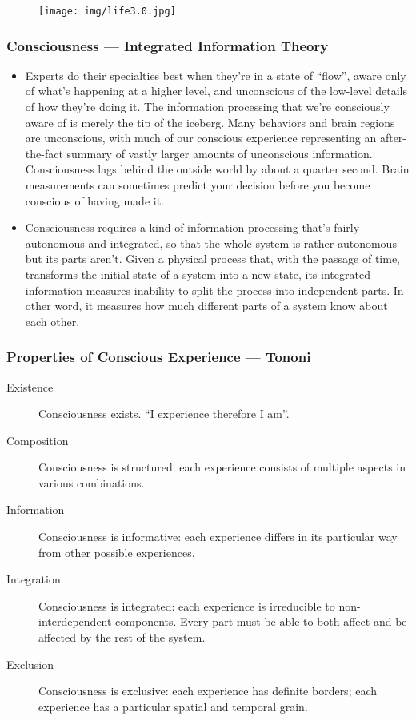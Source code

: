 \documentclass[UTF8,11pt,colorlinks,compress,openany]{beamer}%
\begin{document}
\begin{frame}\frametitle{}
\begin{figure}[H]
\texttt{[image: img/life3.0.jpg]}
\end{figure}	
\end{frame}

\begin{frame}\frametitle{Consciousness --- Integrated Information Theory}
\begin{itemize}
	\item Experts do their specialties best when they're in a state of ``flow'', aware only of what's happening at a higher level, and unconscious of the low-level details of how they're doing it. The information processing that we're consciously aware of is merely the tip of the iceberg. Many behaviors and brain regions are unconscious, with much of our conscious experience representing an after-the-fact summary of vastly larger amounts of unconscious information. Consciousness lags behind the outside world by about a quarter second. Brain measurements can sometimes predict your decision before you become conscious of having made it.
	\item Consciousness requires a kind of information processing that's fairly autonomous and integrated, so that the whole system is rather autonomous but its parts aren't. Given a physical process that, with the passage of time, transforms the initial state of a system into a new state, its integrated information measures inability to split the process into independent parts. In other word, it measures how much different parts of a system know about each other.
\end{itemize}
\end{frame}

\begin{frame}\frametitle{Properties of Conscious Experience --- Tononi}
\begin{description}
	\item[Existence] Consciousness exists. ``I experience therefore I am''.
	\item[Composition] Consciousness is structured: each experience consists of multiple aspects in various combinations.
	\item[Information] Consciousness is informative: each experience differs in its particular way from other possible experiences.
	\item[Integration] Consciousness is integrated: each experience is irreducible to non-interdependent components. Every part must be able to both affect and be affected by the rest of the system.
	\item[Exclusion] Consciousness is exclusive: each experience has definite borders; each experience has a particular spatial and temporal grain.
\end{description}
\end{frame}
\end{document}
